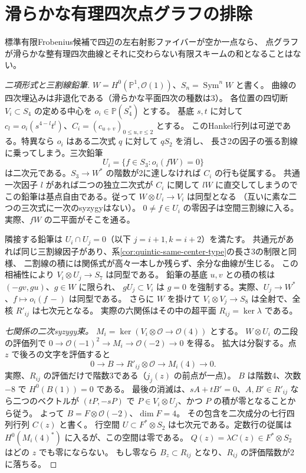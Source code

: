 \section{滑らかな有理四次点グラフの排除}
\label{sec:rational-quartic-exclusion}
\begin{theorem}\label{thm:rational-quartic-exclusion}
標準有限Frobenius候補で四辺の左右射影ファイバーが空か一点なら、
点グラフが滑らかな整有理四次曲線とそれに交わらない有限スキームの和となることはない。
\end{theorem}
\begin{proof}[二項形式と三割線鉛筆]
$W=H^0(\mathbb P^1,\mathcal O(1))$、$S_n=\operatorname{Sym}^n W$ と書く。
曲線の四次埋込みは非退化である（滑らかな平面四次の種数は3）。
各位置の四切断 $V_i\subset S_4$ の定める中心を $o_i\in\mathbb P(S_4^*)$ とする。
基底 $s,t$ に対して $c_l=o_i(s^{4-l}t^l)$、$C_i=(c_{u+v})_{0\le u,v\le2}$ とする。
このHankel行列は可逆である。特異なら $o_i$ はある二次式 $q$ に対して $qS_2$ を消し、
長さ2の因子の張る割線に乗ってしまう。三次鉛筆
\[
 U_i=\{f\in S_3:o_i(fW)=0\}
\]
は二次元である。$S_3\to W^*$ の階数が2に達しなければ $C_i$ の行も従属する。
共通一次因子 $l$ があれば二つの独立二次式が $C_i$ に関して $lW$ に直交してしまうので
この鉛筆は基点自由である。従って $W\otimes U_i\to V_i$ は同型となる
（互いに素な二つの三次式に一次のsyzygyはない）。
$0\ne f\in U_i$ の零因子は空間三割線に入る。実際、$fW$ の二平面がそこを通る。

隣接する鉛筆は $U_i\cap U_j=0$（以下 $j=i+1,k=i+2$）を満たす。
共通元があれば同じ三割線因子があり、系\ref{cor:quintic-same-center-type}の長さ3の制限と同様、
二割線の積には関係式が高々一本しか残らず、余分な曲線が生じる。
この相補性により $V_i\otimes U_j\to S_7$ は同型である。
鉛筆の基底 $u,v$ との積の核は $(-gv,gu)$、$g\in W$ に限られ、
$gU_j\subset V_i$ は $g=0$ を強制する。実際、$U_j\to W^*$、$f\mapsto o_i(f\,{-})$ は同型である。
さらに $W$ を掛けて $V_i\otimes V_j\to S_8$ は全射で、全核 $R'_{ij}$ は七次元となる。
実際の六関係はその中の超平面 $R_{ij}=\ker\lambda$ である。

\smallskip
\noindent\textit{七関係の二次syzygy束。}
$M_i=\ker(V_i\otimes\mathcal O\to\mathcal O(4))$ とする。
$W\otimes U_i$ の二段の評価列で
$0\to\mathcal O(-1)^2\to M_i\to\mathcal O(-2)\to0$ を得る。
拡大は分裂する。点 $z$ で後ろの文字を評価すると
\[
 0\longrightarrow B\longrightarrow R'_{ij}\otimes\mathcal O
   \longrightarrow M_i(4)\longrightarrow0.
\]
実際、$R_{ij}$ の評価だけで階数3である（$j_j(z)$ の前点が一点）。
$B$ は階数4、次数 $-8$ で $H^0(B(1))=0$ である。
最後の消滅は、$sA+tB'=0$、$A,B'\in R'_{ij}$ なら二つのベクトルが $(tP,-sP)$ で
$P\in V_i\otimes U_j$、かつ $P$ の積が零となることから従う。
よって $B=F\otimes\mathcal O(-2)$、$\dim F=4$。
その包含を二次成分の七行四列行列 $C(z)$ と書く。
行空間 $U\subset F^*\otimes S_2$ は七次元である。定数行の従属は
$H^0(M_i(4)^*)$ に入るが、この空間は零である。
$Q(z)=\lambda C(z)\in F^*\otimes S_2$ はどの $z$ でも零にならない。
もし零なら $B_z\subset R_{ij}$ となり、$R_{ij}$ の評価階数が2に落ちる。


\end{proof}
